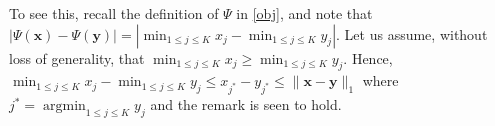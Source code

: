 \documentclass[12pt]{article}
\newcommand{\balpha}{\boldsymbol{\alpha}}
\newcommand{\bTheta}{\boldsymbol{\Theta}}
\newtheorem{lemma}{Lemma}[section]
\newtheorem{remark}{\textbf{Remark}}
\begin{document}
To see this, recall the definition of $\Psi$ in \eqref{obj}, and note that $|\Psi(\bm{x})-\Psi(\bm{y})|=|\min_{1\le j\le K}x_j-\min_{1\le j\le K}y_j|$. Let us assume, without loss of generality, that $\min_{1\le j\le K}x_j\ge \min_{1\le j\le K}y_j$. Hence, $\min_{1\le j\le K}x_j-\min_{1\le j\le K}y_j\le x_{j^*}-y_{j^*}\le \|\bm{x}-\bm{y}\|_1$ where $j^* = \operatorname{argmin}_{1\le j\le K}y_j$ and the remark is seen to hold.





\end{document}
